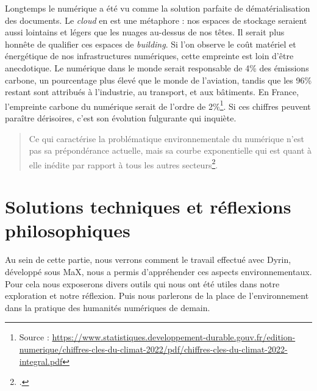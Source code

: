 \documentclass[a4paper,12pt,twoside]{book}
\begin{document}
Longtemps le numérique a été vu comme la solution parfaite de dématérialisation des documents. Le \textit{cloud} en est une métaphore : nos espaces de stockage seraient aussi lointains et légers que les nuages au-dessus de nos têtes. Il serait plus honnête de qualifier ces espaces de \textit{building}. Si l'on observe le coût matériel et énergétique de nos infrastructures numériques, cette empreinte est loin d'être anecdotique. Le numérique dans le monde serait responsable de 4\% des émissions carbone, un pourcentage plus élevé que le monde de l'aviation, tandis que les 96\% restant sont attribués à
l'industrie, au transport, et aux bâtiments. En France, l'empreinte carbone du numérique serait de l'ordre de 2\%\footnote{Source : \url{https://www.statistiques.developpement-durable.gouv.fr/edition-numerique/chiffres-cles-du-climat-2022/pdf/chiffres-cles-du-climat-2022-integral.pdf}}. Si ces chiffres peuvent paraître dérisoires, c'est son évolution fulgurante qui inquiète.

\begin{quote}
    Ce qui caractérise la problématique environnementale du numérique n'est pas sa prépondérance actuelle, mais sa courbe exponentielle qui est quant à elle inédite par rapport à tous les autres secteurs\footcite{sobriete}.
\end{quote}

\chapter{Solutions techniques et réflexions philosophiques}
Au sein de cette partie, nous verrons comment le travail effectué avec Dyrin, développé sous MaX, nous a permis d'appréhender ces aspects environnementaux. Pour cela nous exposerons divers outils qui nous ont été utiles dans notre exploration et notre réflexion. Puis nous parlerons de la place de l'environnement dans la pratique des humanités numériques de demain.
\end{document}
